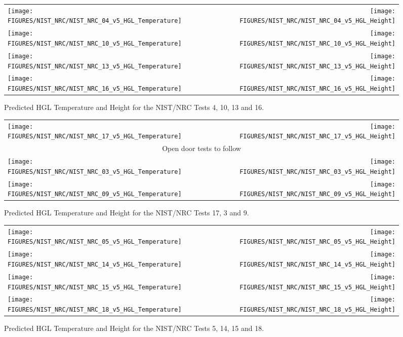 \begin{figure}[p]
\begin{tabular*}{\textwidth}{l@{\extracolsep{\fill}}r}
\texttt{[image: FIGURES/NIST\_NRC/NIST\_NRC\_04\_v5\_HGL\_Temperature]} &
\texttt{[image: FIGURES/NIST\_NRC/NIST\_NRC\_04\_v5\_HGL\_Height]} \\
\texttt{[image: FIGURES/NIST\_NRC/NIST\_NRC\_10\_v5\_HGL\_Temperature]} &
\texttt{[image: FIGURES/NIST\_NRC/NIST\_NRC\_10\_v5\_HGL\_Height]} \\
\texttt{[image: FIGURES/NIST\_NRC/NIST\_NRC\_13\_v5\_HGL\_Temperature]} &
\texttt{[image: FIGURES/NIST\_NRC/NIST\_NRC\_13\_v5\_HGL\_Height]} \\
\texttt{[image: FIGURES/NIST\_NRC/NIST\_NRC\_16\_v5\_HGL\_Temperature]} &
\texttt{[image: FIGURES/NIST\_NRC/NIST\_NRC\_16\_v5\_HGL\_Height]}
\end{tabular*}
\caption{Predicted HGL Temperature and Height for the NIST/NRC Tests 4, 10, 13 and 16.} \label{NIST_NRC_HGL_Closed_2}
\end{figure}

\begin{figure}[p]
\begin{tabular*}{\textwidth}{l@{\extracolsep{\fill}}r}
\texttt{[image: FIGURES/NIST\_NRC/NIST\_NRC\_17\_v5\_HGL\_Temperature]} &
\texttt{[image: FIGURES/NIST\_NRC/NIST\_NRC\_17\_v5\_HGL\_Height]} \\
\multicolumn{2}{c}{Open door tests to follow} \\
\texttt{[image: FIGURES/NIST\_NRC/NIST\_NRC\_03\_v5\_HGL\_Temperature]} &
\texttt{[image: FIGURES/NIST\_NRC/NIST\_NRC\_03\_v5\_HGL\_Height]} \\
\texttt{[image: FIGURES/NIST\_NRC/NIST\_NRC\_09\_v5\_HGL\_Temperature]} &
\texttt{[image: FIGURES/NIST\_NRC/NIST\_NRC\_09\_v5\_HGL\_Height]}
\end{tabular*}
\caption{Predicted HGL Temperature and Height for the NIST/NRC Tests 17, 3 and 9.} \label{NIST_NRC_HGL_Open_1}
\end{figure}

\begin{figure}[p]
\begin{tabular*}{\textwidth}{l@{\extracolsep{\fill}}r}
\texttt{[image: FIGURES/NIST\_NRC/NIST\_NRC\_05\_v5\_HGL\_Temperature]} &
\texttt{[image: FIGURES/NIST\_NRC/NIST\_NRC\_05\_v5\_HGL\_Height]} \\
\texttt{[image: FIGURES/NIST\_NRC/NIST\_NRC\_14\_v5\_HGL\_Temperature]} &
\texttt{[image: FIGURES/NIST\_NRC/NIST\_NRC\_14\_v5\_HGL\_Height]} \\
\texttt{[image: FIGURES/NIST\_NRC/NIST\_NRC\_15\_v5\_HGL\_Temperature]} &
\texttt{[image: FIGURES/NIST\_NRC/NIST\_NRC\_15\_v5\_HGL\_Height]} \\
\texttt{[image: FIGURES/NIST\_NRC/NIST\_NRC\_18\_v5\_HGL\_Temperature]} &
\texttt{[image: FIGURES/NIST\_NRC/NIST\_NRC\_18\_v5\_HGL\_Height]}
\end{tabular*}
\caption{Predicted HGL Temperature and Height for the NIST/NRC Tests 5, 14, 15 and 18.} \label{NIST_NRC_HGL_Open_2}
\end{figure}

